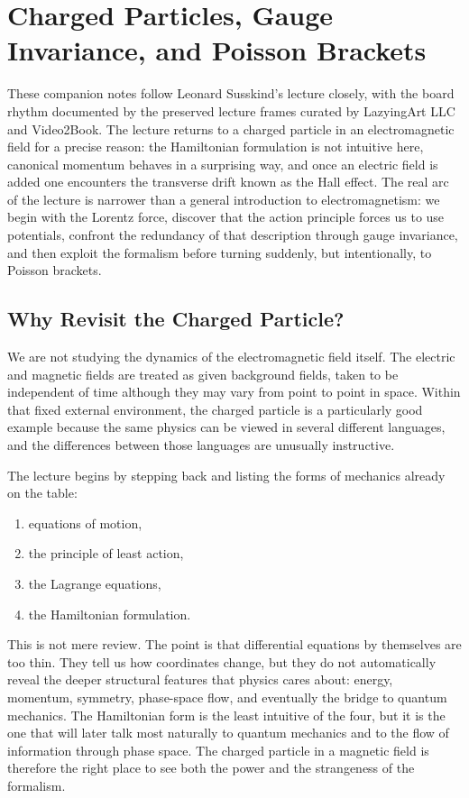 \chapter{Charged Particles, Gauge Invariance, and Poisson Brackets}

These companion notes follow Leonard Susskind's lecture closely, with the board rhythm documented by the preserved lecture frames curated by LazyingArt LLC and Video2Book. The lecture returns to a charged particle in an electromagnetic field for a precise reason: the Hamiltonian formulation is not intuitive here, canonical momentum behaves in a surprising way, and once an electric field is added one encounters the transverse drift known as the Hall effect. The real arc of the lecture is narrower than a general introduction to electromagnetism: we begin with the Lorentz force, discover that the action principle forces us to use potentials, confront the redundancy of that description through gauge invariance, and then exploit the formalism before turning suddenly, but intentionally, to Poisson brackets.

\section{Why Revisit the Charged Particle?}

We are not studying the dynamics of the electromagnetic field itself. The electric and magnetic fields are treated as given background fields, taken to be independent of time although they may vary from point to point in space. Within that fixed external environment, the charged particle is a particularly good example because the same physics can be viewed in several different languages, and the differences between those languages are unusually instructive.

The lecture begins by stepping back and listing the forms of mechanics already on the table:
\begin{enumerate}
\item equations of motion,
\item the principle of least action,
\item the Lagrange equations,
\item the Hamiltonian formulation.
\end{enumerate}

This is not mere review. The point is that differential equations by themselves are too thin. They tell us how coordinates change, but they do not automatically reveal the deeper structural features that physics cares about: energy, momentum, symmetry, phase-space flow, and eventually the bridge to quantum mechanics. The Hamiltonian form is the least intuitive of the four, but it is the one that will later talk most naturally to quantum mechanics and to the flow of information through phase space. The charged particle in a magnetic field is therefore the right place to see both the power and the strangeness of the formalism.

